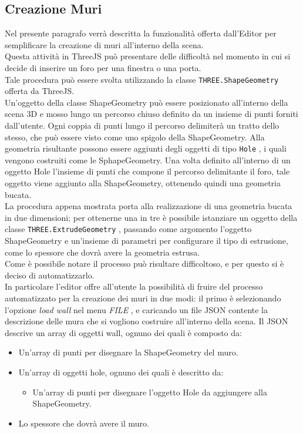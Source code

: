 \subsection{Creazione Muri}
\label{sec:chapter_creazione_scena_funzionalita_editor_muri}
Nel presente paragrafo verrà descritta la funzionalità offerta dall’Editor per semplificare la creazione di muri all’interno della scena.
\\
Questa attività in ThreeJS può presentare delle difficoltà nel momento in cui si decide di inserire un foro per una finestra o una porta.
\\
Tale procedura può essere svolta utilizzando la classe \texttt{THREE.ShapeGeometry} offerta da ThreeJS.
\\
Un’oggetto della classe ShapeGeometry può essere posizionato all'interno della scena 3D e mosso lungo un percorso chiuso definito da un insieme di punti forniti dall’utente. Ogni coppia di punti lungo il percorso delimiterà un tratto dello stesso, che può essere visto come uno spigolo della ShapeGeometry. Alla geometria risultante possono essere aggiunti degli oggetti di tipo \texttt{Hole} , i quali vengono costruiti come le SphapeGeometry. Una volta definito all’interno di un oggetto Hole l’insieme di punti che compone il percorso delimitante il foro, tale oggetto viene aggiunto alla ShapeGeometry, ottenendo quindi una geometria bucata.
\\
La procedura appena mostrata porta alla realizzazione di una geometria bucata in due dimensioni; per ottenerne una in tre è possibile istanziare un oggetto della classe \texttt{THREE.ExtrudeGeometry} , passando come argomento l’oggetto ShapeGeometry e un’insieme di parametri per configurare il tipo di estrusione, come lo spessore che dovrà avere la geometria estrusa. 
\\
Come è possibile notare il processo può risultare difficoltoso, e per questo si è deciso di automatizzarlo.
\\ 
In particolare l’editor offre all’utente la possibilità di fruire del processo automatizzato per la creazione dei muri in due modi: il primo è selezionando l’opzione \emph{load wall} nel menu \emph{FILE} , e caricando un file JSON contente la descrizione delle mura che si vogliono costruire all’interno della scena. 
Il JSON descrive un array di oggetti wall, ognuno dei quali è composto da:
\begin{itemize}
\item Un’array di punti per disegnare la ShapeGeometry del muro.
\item Un’array di oggetti hole, ognuno dei quali è descritto da:
\begin{itemize}
\item Un’array di punti per disegnare l’oggetto Hole da aggiungere alla ShapeGeometry.
\end{itemize}
\item Lo spessore che dovrà avere il muro.
\end{itemize}
